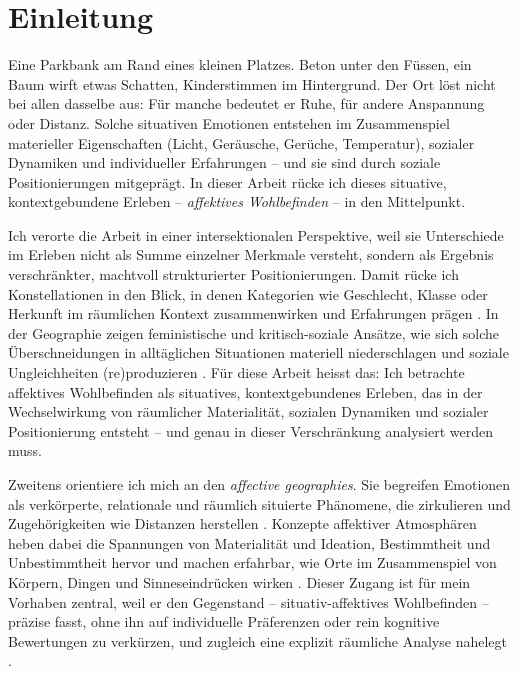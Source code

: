 \chapter{Einleitung} \label{sec:einleitung}

Eine Parkbank am Rand eines kleinen Platzes. Beton unter den Füssen, ein Baum wirft etwas Schatten, Kinderstimmen im Hintergrund. Der Ort löst nicht bei allen dasselbe aus: Für manche bedeutet er Ruhe, für andere Anspannung oder Distanz. Solche situativen Emotionen entstehen im Zusammenspiel materieller Eigenschaften (Licht, Geräusche, Gerüche, Temperatur), sozialer Dynamiken und individueller Erfahrungen -- und sie sind durch soziale Positionierungen mitgeprägt. In dieser Arbeit rücke ich dieses situative, kontextgebundene Erleben -- \emph{affektives Wohlbefinden} -- in den Mittelpunkt.

Ich verorte die Arbeit in einer intersektionalen Perspektive, weil sie Unterschiede im Erleben nicht als Summe einzelner Merkmale versteht, sondern als Ergebnis verschränkter, machtvoll strukturierter Positionierungen. Damit rücke ich Konstellationen in den Blick, in denen Kategorien wie Geschlecht, Klasse oder Herkunft im räumlichen Kontext zusammenwirken und Erfahrungen prägen \parencite{crenshawMappingMarginsIntersectionality1991, valentineTheorizingResearchingIntersectionality2007}. In der Geographie zeigen feministische und kritisch-soziale Ansätze, wie sich solche Überschneidungen in alltäglichen Situationen materiell niederschlagen und soziale Ungleichheiten (re)produzieren \parencite{rodo-de-zarateDevelopingGeographiesIntersectionality2014, rodo-de-zarateIntersectionalityFeministGeographies2018, rodo-de-zarateIntersectionalitySpatialityEmotions2023}. Für diese Arbeit heisst das: Ich betrachte affektives Wohlbefinden als situatives, kontextgebundenes Erleben, das in der Wechselwirkung von räumlicher Materialität, sozialen Dynamiken und sozialer Positionierung entsteht -- und genau in dieser Verschränkung analysiert werden muss.

Zweitens orientiere ich mich an den \emph{affective geographies}. Sie begreifen Emotionen als verkörperte, relationale und räumlich situierte Phänomene, die zirkulieren und Zugehörigkeiten wie Distanzen herstellen \parencite{ahmedAffectiveEconomies2004}. Konzepte affektiver Atmosphären heben dabei die Spannungen von Materialität und Ideation, Bestimmtheit und Unbestimmtheit hervor und machen erfahrbar, wie Orte im Zusammenspiel von Körpern, Dingen und Sinneseindrücken wirken \parencite{andersonAffectiveAtmospheres2009}. Dieser Zugang ist für mein Vorhaben zentral, weil er den Gegenstand -- situativ-affektives Wohlbefinden -- präzise fasst, ohne ihn auf individuelle Präferenzen oder rein kognitive Bewertungen zu verkürzen, und zugleich eine explizit räumliche Analyse nahelegt \parencite{rodo-de-zarateIntersectionalitySpatialityEmotions2023}.

